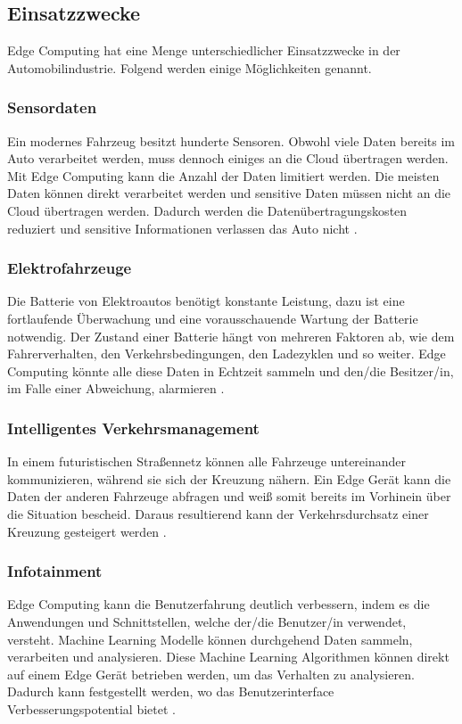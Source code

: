 \documentclass{sigchi}
\begin{document}
\subsection{Einsatzzwecke}
Edge Computing hat eine Menge unterschiedlicher Einsatzzwecke in der Automobilindustrie. Folgend werden einige Möglichkeiten genannt.

\subsubsection{Sensordaten}
Ein modernes Fahrzeug besitzt hunderte Sensoren. Obwohl viele Daten bereits im Auto verarbeitet werden, muss dennoch einiges an die Cloud übertragen werden. Mit Edge Computing kann die Anzahl der Daten limitiert werden. Die meisten Daten können direkt verarbeitet werden und sensitive Daten müssen nicht an die Cloud übertragen werden. Dadurch werden die Datenübertragungskosten reduziert und sensitive Informationen verlassen das Auto nicht \cite{role-edge-computing:2020}.

\subsubsection{Elektrofahrzeuge}
Die Batterie von Elektroautos benötigt konstante Leistung, dazu ist eine fortlaufende Überwachung und eine vorausschauende Wartung der Batterie notwendig. Der Zustand einer Batterie hängt von mehreren Faktoren ab, wie dem Fahrerverhalten, den Verkehrsbedingungen, den Ladezyklen und so weiter. Edge Computing könnte alle diese Daten in Echtzeit sammeln und den/die Besitzer/in, im Falle einer Abweichung, alarmieren \cite{role-edge-computing:2020}. 

\subsubsection{Intelligentes Verkehrsmanagement}
In einem futuristischen Straßennetz können alle Fahrzeuge untereinander kommunizieren, während sie sich der Kreuzung nähern. Ein Edge Gerät kann die Daten der anderen Fahrzeuge abfragen und weiß somit bereits im Vorhinein über die Situation bescheid. Daraus resultierend kann der Verkehrsdurchsatz einer Kreuzung gesteigert werden \cite{role-edge-computing:2020}.

\subsubsection{Infotainment}
Edge Computing kann die Benutzerfahrung deutlich verbessern, indem es die Anwendungen und Schnittstellen, welche der/die Benutzer/in verwendet, versteht. Machine Learning Modelle können durchgehend Daten sammeln, verarbeiten und analysieren. Diese Machine Learning Algorithmen können direkt auf einem Edge Gerät betrieben werden, um das Verhalten zu analysieren. Dadurch kann festgestellt werden, wo das Benutzerinterface Verbesserungspotential bietet \cite{role-edge-computing:2020}.
\end{document}
